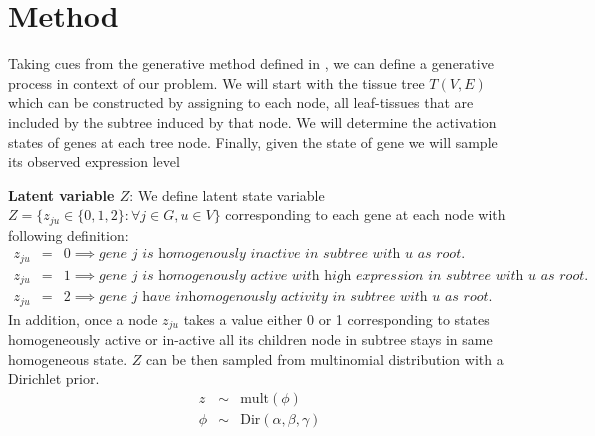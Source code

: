 \documentclass{article}
\begin{document}
\section{Method}
Taking cues from the generative method defined in \cite{Kaski2010}, we can define a generative process in context of our problem. We will start with the tissue tree $T(V,E)$ which can be constructed by assigning to each node, all leaf-tissues that are included by the subtree induced by that node. We will determine the activation states of genes at each tree node. Finally, given the state of gene we will sample its observed expression level
\par \textbf{Latent variable $Z$}:
We define latent state variable $Z= \{z_{ju} \in\{0,1,2\} : \forall j \in G, u \in V\}$ corresponding to each gene at each node with following definition:
\begin{eqnarray}
	z_{ju} &=& 0 \implies \textit{gene $j$ is homogenously inactive in subtree with $u$ as root.} \nonumber\\ 
	z_{ju} &=& 1 \implies \textit{gene $j$ is homogenously active with high expression in subtree with  $u$ as root.} \nonumber \\
	z_{ju} &=& 2 \implies \textit{gene $j$ have inhomogenously activity in subtree with $u$ as root.} \nonumber 
\end{eqnarray}
In addition, once a node $z_{ju}$ takes a value either 0 or 1 corresponding to states homogeneously active or in-active all its children 
node in subtree stays in same homogeneous state. $Z$ can be then sampled from multinomial distribution with a Dirichlet prior.
\begin{eqnarray}
	z &\sim& \text{mult}(\phi) \nonumber \\
	\phi &\sim&  \text{Dir}(\alpha,\beta,\gamma) \nonumber
	\label{eqn:zdist}
\end{eqnarray}
\end{document}
